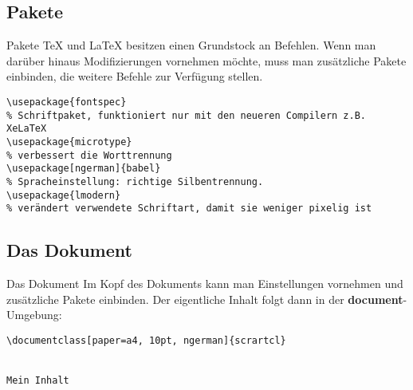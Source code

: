\subsection{Pakete}
\begin{frame}[fragile]{Pakete}
\TeX{} und \LaTeX{} besitzen einen Grundstock an Befehlen. Wenn man darüber hinaus Modifizierungen vornehmen möchte, muss man zusätzliche Pakete einbinden, die weitere Befehle zur Verfügung stellen.\pause

\begin{lstlisting}[style=tex]
\usepackage{fontspec}
% Schriftpaket, funktioniert nur mit den neueren Compilern z.B. XeLaTeX
\usepackage{microtype}
% verbessert die Worttrennung
\usepackage[ngerman]{babel}
% Spracheinstellung: richtige Silbentrennung.
\usepackage{lmodern}
% verändert verwendete Schriftart, damit sie weniger pixelig ist
\end{lstlisting}
\end{frame}

\subsection{Das Dokument}
\begin{frame}[fragile]{Das Dokument}
Im Kopf des Dokuments kann man Einstellungen vornehmen und zusätzliche Pakete einbinden. Der eigentliche Inhalt folgt dann in der \textbf{document}-Umgebung:
\begin{lstlisting}[style=tex]
\documentclass[paper=a4, 10pt, ngerman]{scrartcl}


Mein Inhalt
\end{lstlisting}
\end{frame}

